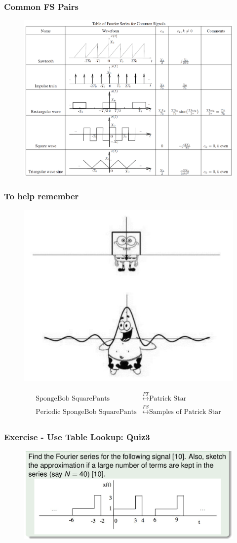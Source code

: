 \documentclass{beamer}
\begin{document}
\begin{frame}
    \frametitle{Common FS Pairs}
    \begin{figure}
        \includegraphics[width=0.8\linewidth]{FS_Table}
    \end{figure}
\end{frame}

\begin{frame}[t]
    \frametitle{To help remember}
    \begin{figure}
        \includegraphics[width=0.4\linewidth]{sponge.PNG}
    \end{figure}
    \begin{center}
        \begin{align*}
            \text{SpongeBob SquarePants} &\stackrel{FT}{\longleftrightarrow}  \text{Patrick Star} \\[1em]
            \text{Periodic SpongeBob SquarePants} &\stackrel{FS}{\longleftrightarrow}  \text{Samples of Patrick Star} \\[1em]            
        \end{align*}
    \end{center} 
\end{frame}

\begin{frame}[t]
    \frametitle{Exercise - Use Table Lookup: Quiz3}
    \begin{figure}
        \includegraphics[width=0.7\linewidth]{quiz3.PNG}
    \end{figure}
\end{frame}
\end{document}
